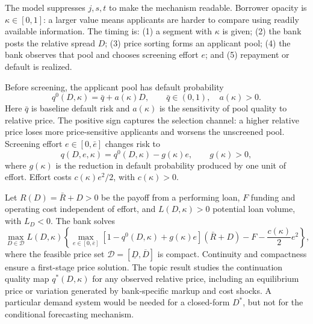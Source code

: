 \documentclass[11pt]{article}
\begin{document}
The model suppresses \(j,s,t\) to make the mechanism readable. Borrower
opacity is \(\kappa\in[0,1]\): a larger value means applicants are harder to
compare using readily available information. The timing is: (1) a segment
with \(\kappa\) is given; (2) the bank posts the relative spread \(D\); (3)
price sorting forms an applicant pool; (4) the bank observes that pool and
chooses screening effort \(e\); and (5) repayment or default is realized.

Before screening, the applicant pool has default probability
\begin{equation}
q^0(D,\kappa)=\bar q+a(\kappa)D,
\qquad \bar q\in(0,1),\quad a(\kappa)>0.
\label{eq:pool}
\end{equation}
Here \(\bar q\) is baseline default risk and \(a(\kappa)\) is the sensitivity
of pool quality to relative price. The positive sign captures the selection
channel: a higher relative price loses more price-sensitive applicants and
worsens the unscreened pool. Screening effort \(e\in[0,\bar e]\) changes risk
to
\begin{equation}
q(D,e,\kappa)=q^0(D,\kappa)-g(\kappa)e,
\qquad g(\kappa)>0,
\label{eq:quality}
\end{equation}
where \(g(\kappa)\) is the reduction in default probability produced by one
unit of effort. Effort costs \(c(\kappa)e^2/2\), with \(c(\kappa)>0\).

Let \(R(D)=\bar R+D>0\) be the payoff from a performing loan,
\(F\) funding and operating cost independent of effort, and
\(L(D,\kappa)>0\) potential loan volume, with \(L_D<0\). The bank solves
\begin{equation}
\max_{D\in\mathcal D} L(D,\kappa)
\left\{\max_{e\in[0,\bar e]}
[1-q^0(D,\kappa)+g(\kappa)e](\bar R+D)
-F-\frac{c(\kappa)}2e^2\right\},
\label{eq:problem}
\end{equation}
where the feasible price set
\(\mathcal D=[\underline D,\overline D]\) is compact. Continuity and compactness
ensure a first-stage price solution. The topic result studies the continuation
quality map \(q^*(D,\kappa)\) for any observed relative price, including an
equilibrium price or variation generated by bank-specific markup and cost
shocks. A particular demand system would be needed for a closed-form \(D^*\),
but not for the conditional forecasting mechanism.
\end{document}
